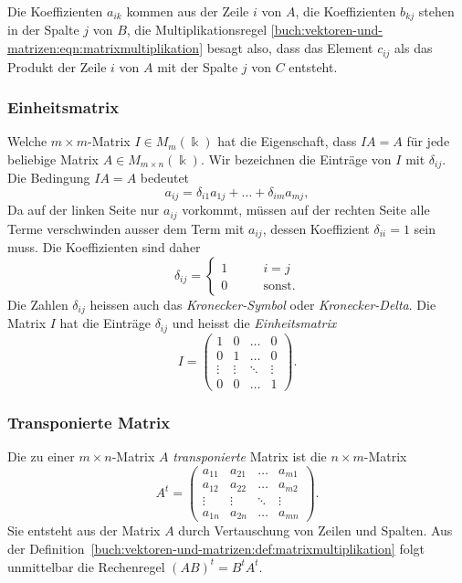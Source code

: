 Die Koeffizienten $a_{ik}$ kommen aus der Zeile $i$ von $A$, die Koeffizienten
$b_{k\!j}$ stehen in der Spalte $j$ von $B$, die Multiplikationsregel
\eqref{buch:vektoren-und-matrizen:eqn:matrixmultiplikation}
besagt also, dass das Element $c_{i\!j}$ als das Produkt
der Zeile $i$ von $A$ mit der Spalte $j$ von $C$ entsteht.

\subsubsection{Einheitsmatrix}
Welche $m\times m$-Matrix $I\in M_{m}(\Bbbk)$ hat die Eigenschaft, dass
$IA=A$ für jede beliebige Matrix $A\in M_{m\times n}(\Bbbk)$.
Wir bezeichnen die Einträge von $I$ mit $\delta_{i\!j}$.
Die Bedingung $IA=A$ bedeutet
\[
a_{i\!j} = \delta_{i1}a_{1j} + \dots + \delta_{im}a_{mj},
\]
Da auf der linken Seite nur $a_{i\!j}$ vorkommt, müssen
auf der rechten Seite alle Terme
verschwinden ausser dem Term mit $a_{i\!j}$, dessen
Koeffizient $\delta_{ii}=1$ sein muss.
Die Koeffizienten sind daher
\[
\delta_{i\!j}
=
\begin{cases}
1&\qquad i=j\\
0&\qquad\text{sonst.}
\end{cases}
\]
Die Zahlen $\delta_{i\!j}$ heissen auch das {\em Kronecker-Symbol} oder
{\em Kronecker-Delta}.
%
%
Die Matrix $I$ hat die Einträge $\delta_{i\!j}$ und heisst die
{\em Einheitsmatrix}
%
\[
I
=
\begin{pmatrix}
1     &0     &\dots &0     \\
0     &1     &\dots &0     \\[-2pt]
\vdots&\vdots&\ddots&\vdots\\
0     &0     &\dots &1
\end{pmatrix}.
\]

\subsubsection{Transponierte Matrix}
%
%
Die zu einer $m\times n$-Matrix $A$ {\em transponierte} Matrix ist die
$n\times m$-Matrix
\[
A^t=\begin{pmatrix}
a_{11}&a_{21}&\dots&a_{m1}\\
a_{12}&a_{22}&\dots&a_{m2}\\
\vdots&\vdots&\ddots&\vdots\\
a_{1n}&a_{2n}&\dots&a_{mn}
\end{pmatrix}.
\]
Sie entsteht aus der Matrix $A$ durch Vertauschung von Zeilen und Spalten.
Aus der Definition~\ref{buch:vektoren-und-matrizen:def:matrixmultiplikation}
folgt unmittelbar die Rechenregel $(AB)^t = B^tA^t$.

